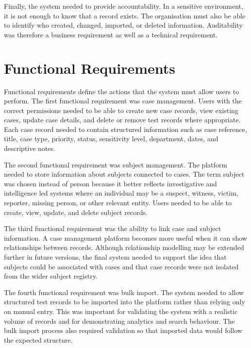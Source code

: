 Finally, the system needed to provide accountability. In a sensitive environment, it is not enough to know that a record exists. The organisation must also be able to identify who created, changed, imported, or deleted information. Auditability was therefore a business requirement as well as a technical requirement.


\section{Functional Requirements}

Functional requirements define the actions that the system must allow users to perform. The first functional requirement was case management. Users with the correct permissions needed to be able to create new case records, view existing cases, update case details, and delete or remove test records where appropriate. Each case record needed to contain structured information such as case reference, title, case type, priority, status, sensitivity level, department, dates, and descriptive notes.

The second functional requirement was subject management. The platform needed to store information about subjects connected to cases. The term subject was chosen instead of person because it better reflects investigative and intelligence led systems where an individual may be a suspect, witness, victim, reporter, missing person, or other relevant entity. Users needed to be able to create, view, update, and delete subject records.

The third functional requirement was the ability to link case and subject information. A case management platform becomes more useful when it can show relationships between records. Although relationship modelling may be extended further in future versions, the final system needed to support the idea that subjects could be associated with cases and that case records were not isolated from the wider subject registry.

The fourth functional requirement was bulk import. The system needed to allow structured test records to be imported into the platform rather than relying only on manual entry. This was important for validating the system with a realistic volume of records and for demonstrating analytics and search behaviour. The bulk import process also required validation so that imported data would follow the expected structure.

